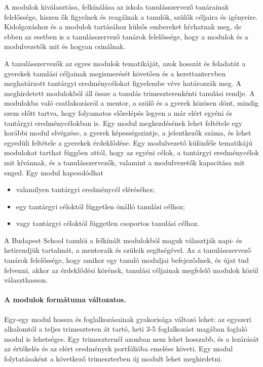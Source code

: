 A modulok kiválasztása, felkínálása az iskola tanulásszervező tanárainak
felelőssége, hiszen ők figyelnek és reagálnak a tanulók, szülők céljaira és
igényeire. Kidolgozáshoz és a modulok tartásához külsős embereket hívhatnak
meg, de ebben az esetben is a tanulásszervező tanárok felelőssége, hogy a
modulok és a modulvezetők mit és hogyan csinálnak.

A tanulásszervezők az egyes modulok tematikáját, azok hosszát és feladatát a
gyerekek tanulási céljainak megismerését követően és a kerettantervben
meghatárzott tantárgyi eredménycélokat figyelembe véve határozzák meg. A
meghirdetett modulokból áll össze a tanulás trimeszterenkénti tanulási rendje.
A modulokba való csatlakozásról a mentor, a szülő és a gyerek közösen dönt,
mindig szem előtt tartva, hogy folyamatos előrelépés legyen a már elért egyéni
és tantárgyi eredménycélokban is. Egy modul megkezdésének lehet feltétele egy
korábbi modul elvégzése, a gyerek képességszintje, a jelentkezők száma, és
lehet egyedüli feltétele a gyerekek érdeklődése. Egy modulvezető különféle
tematikájú modulokat tarthat függően attól, hogy az egyéni célok, a tantárgyi
eredménycélok mit kívánnak, és a tanulásszervezők, valamint a modulvezetők
kapacitása mit enged. Egy modul kapcsolódhat

\begin{itemize}

  \item valamilyen tantárgyi eredménycél eléréséhez;
  \item egy tantárgyi céloktól független önálló tanulási célhoz;
  \item vagy tantárgyi céloktól független csoportos tanulási célhoz.
\end{itemize}

A Budapest School tanulói a felkínált modulokból maguk választják napi- és
hetirendjük tartalmát, a mentoraik és szüleik segítségével. Az a
tanulásszervező tanárok felelőssége, hogy amikor egy tanuló moduljai
befejeződnek, és újat tud felvenni, akkor az érdeklődési körének, tanulási
céljainak megfelelő modulok közül választhasson.

\paragraph{A modulok formátuma változatos.}
Egy-egy modul hossza és foglalkozásainak gyakorisága változó lehet: az egyszeri
alkalomtól a teljes trimeszteren át tartó, heti 3-5 foglalkozást magában
foglaló modul is lehetséges. Egy trimeszternél azonban nem lehet hosszabb, és a
lezárását az értékelés és az elért eredmények portfólióba emelése követi. Egy
modul folytatásaként a következő trimeszterben új modult lehet meghirdetni.

